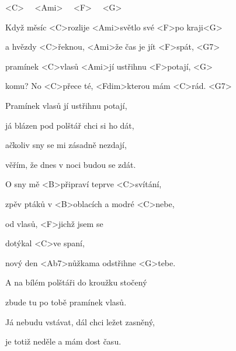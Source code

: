 

<C>~~ <Ami>~~ <F>~~ <G>

\zs
Když měsíc <C>rozlije <Ami>světlo své <F>po kraji<G>

a hvězdy <C>řeknou, <Ami>že čas je jít <F>spát, <G7>

pramínek <C>vlasů <Ami>jí ustřihnu <F>potají, <G>

komu? No <C>přece té, <Fdim>kterou mám <C>rád. <G7>
\ks

\zs
Pramínek vlasů jí ustřihnu potají,

já blázen pod polštář chci si ho dát,

ačkoliv sny se mi zásadně nezdají,

věřím, že dnes v noci budou se zdát.
\ks

\zr
O sny mě <B>připraví teprve <C>svítání,

zpěv ptáků v <B>oblacích a modré <C>nebe,

od vlasů, <F>jichž jsem se

dotýkal <C>ve spaní,

nový den <Ab7>nůžkama odstřihne <G>tebe.
\kr

\zs
A na bílém polštáři do kroužku stočený

zbude tu po tobě pramínek vlasů.

Já nebudu vstávat, dál chci ležet zasněný,

je totiž neděle a mám dost času.
\ks

\zr \kr

\kp
